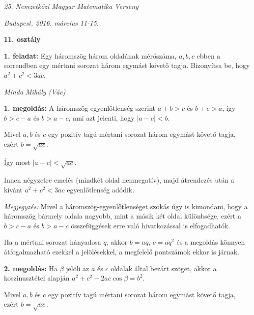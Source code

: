 \documentclass[a4paper,10pt]{article}
\newcommand{\ki}[2]{\hfill {\it #1 (#2)}\medskip}
\begin{document}
\begin{center} \Large {\em 25. Nemzetközi Magyar Matematika Verseny} \end{center}
\begin{center} \large{\em Budapest, 2016. március 11-15.} \end{center}
\smallskip
\begin{center} \large{\bf 11. osztály} \end{center}
\bigskip 

{\bf 1. feladat: } Egy háromszög három oldalának mérőszáma, $a,b,c$ ebben a sorrendben egy mértani sorozat három egymást követő tagja. Bizonyítsa be, hogy $a^2+c^2<3ac$.

\ki{Minda Mihály}{Vác}\medskip

{\bf 1. megoldás: } A háromszög-egyenlőtlenség szerint $a+b>c$ és $b+c>a$, így $b>c-a$ és $b>a-c$, ami azt jelenti, hogy $|a-c|<b$. 

\smallskip

\noindent Mivel $a,b$ és $c$ egy pozitív tagú mértani sorozat három egymást követő tagja, ezért $b=\sqrt{ac}$. 

\smallskip

\noindent Így most $|a-c|<\sqrt{ac}$. 

\smallskip

\noindent Innen négyzetre emelés (mindkét oldal nemnegatív), majd átrendezés után a kívánt
$a^2+c^2<3ac$ egyenlőtlenség adódik.


\medskip

\emph{Megjegyzés:} Mivel a háromszög-egyenlőtlenséget szokás úgy is kimondani, hogy a háromszög bármely oldala nagyobb, mint a másik két oldal különbsége, ezért a $b>c-a$ és $b>a-c$ összefüggések erre való hivatkozással is elfogadhatók. 

\smallskip

\noindent Ha a mértani sorozat hányadosa $q$, akkor $b=aq$, $c=aq^2$ és a megoldás könnyen átfogalmazható ezekkel a jelölésekkel, a megfelelő pontszámok ekkor is járnak.


\medskip

{\bf 2. megoldás: }  Ha $\beta$ jelöli az $a$ és $c$ oldalak által bezárt szöget, akkor a koszinusztétel alapján $a^2+c^2-2ac\cos\beta=b^2$. 

\smallskip

\noindent Mivel $a,b$ és $c$ egy pozitív tagú mértani sorozat három egymást követő tagja, ezért $b=\sqrt{ac}$. 

\smallskip
\end{document}

